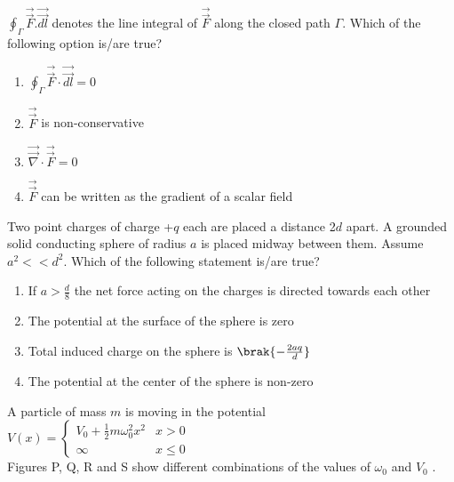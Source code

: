 $\oint_\Gamma \Vec{\overrightarrow{F}}.\Vec{\overrightarrow{dl}}$ denotes the line integral of $\Vec{\overrightarrow{F}}$ along the closed path $\Gamma$. Which of the following option is/are true?
\begin{enumerate}
    \item $\oint_\Gamma \Vec{\overrightarrow{F}}\cdot\Vec{\overrightarrow{dl}}=0$
    \item $\Vec{\overrightarrow{F}}$ is non-conservative
    \item $\Vec{\overrightarrow{\nabla}}\cdot\Vec{\overrightarrow{F}}=0$
    \item  $\Vec{\overrightarrow{F}}$ can be written as the gradient of a scalar field
\end{enumerate}
\item Two point charges of charge +$q$ each are placed a distance 2$d$ apart. A grounded
solid conducting sphere of radius $a$ is placed midway between them.
Assume $a^2<<d^2$. Which of the following statement is/are true?
\begin{enumerate}
    \item  If $a>\frac{d}{8}$ the net force acting on the charges is directed towards each other
    \item The potential at the surface of the sphere is zero
    \item Total induced charge on the sphere is $\brak{-\frac{2aq}{d}}$
    \item The potential at the center of the sphere is non-zero
\end{enumerate}
\item A particle of mass $m$ is moving in the potential  \\
  $ V(x)= \begin{cases} V_0+\frac{1}{2}m\omega_0^2x^2 & x>0 \\ \infty & x\leq0 \end{cases}$ \\
Figures P, Q, R and S show different combinations of the values of $\omega_0$ and $V_0$ . \\ 

